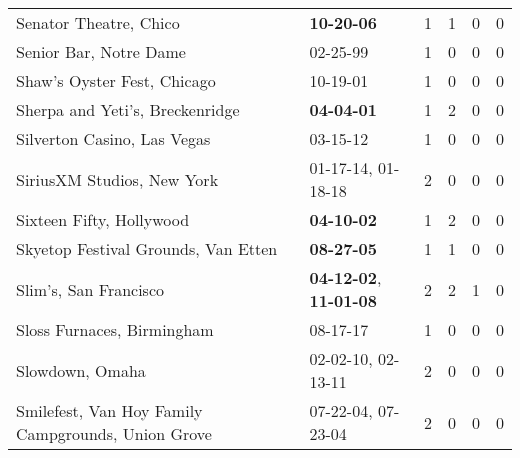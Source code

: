 \begin{longtable}{p{}p{}p{}p{}p{}p{}}
                                                       Senator Theatre, Chico &                                       \textbf{10-20-06\textsuperscript{}} &  1 &  1 &  0 &  0 \\
                                                       Senior Bar, Notre Dame &                                                02-25-99\textsuperscript{} &  1 &  0 &  0 &  0 \\
                                                  Shaw's Oyster Fest, Chicago &                                                10-19-01\textsuperscript{} &  1 &  0 &  0 &  0 \\
                                              Sherpa and Yeti's, Breckenridge &                                       \textbf{04-04-01\textsuperscript{}} &  1 &  2 &  0 &  0 \\
                                                  Silverton Casino, Las Vegas &                                                03-15-12\textsuperscript{} &  1 &  0 &  0 &  0 \\
                                                   SiriusXM Studios, New York &                    01-17-14\textsuperscript{}, 01-18-18\textsuperscript{} &  2 &  0 &  0 &  0 \\
                                                     Sixteen Fifty, Hollywood &                                       \textbf{04-10-02\textsuperscript{}} &  1 &  2 &  0 &  0 \\
                                          Skyetop Festival Grounds, Van Etten &                                       \textbf{08-27-05\textsuperscript{}} &  1 &  1 &  0 &  0 \\
                                                        Slim's, San Francisco &  \textbf{04-12-02\textsuperscript{}}, \textbf{11-01-08\textsuperscript{}} &  2 &  2 &  1 &  0 \\
                                                   Sloss Furnaces, Birmingham &                                                08-17-17\textsuperscript{} &  1 &  0 &  0 &  0 \\
                                                              Slowdown, Omaha &                    02-02-10\textsuperscript{}, 02-13-11\textsuperscript{} &  2 &  0 &  0 &  0 \\
                           Smilefest, Van Hoy Family Campgrounds, Union Grove &                    07-22-04\textsuperscript{}, 07-23-04\textsuperscript{} &  2 &  0 &  0 &  0 \\

\end{longtable}
